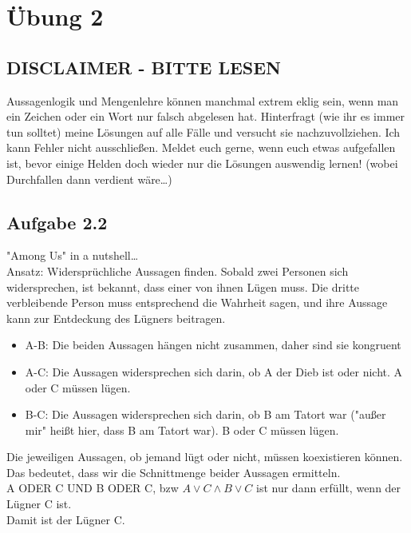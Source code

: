 \documentclass{standalone}
\begin{document}
\section{Übung 2}

\subsection{DISCLAIMER - BITTE LESEN}
Aussagenlogik und Mengenlehre können manchmal extrem eklig sein, wenn man ein Zeichen oder ein Wort nur falsch abgelesen hat.
Hinterfragt (wie ihr es immer tun solltet) meine Lösungen auf alle Fälle und versucht sie nachzuvollziehen. 
Ich kann Fehler nicht ausschließen. Meldet euch gerne, wenn euch etwas aufgefallen ist, bevor einige Helden doch wieder nur die Lösungen auswendig lernen! (wobei Durchfallen dann verdient wäre\dots)

\subsection{Aufgabe 2.2}
"Among Us" in a nutshell\dots\\

Ansatz: Widersprüchliche Aussagen finden. Sobald zwei Personen sich widersprechen, ist bekannt, dass einer von ihnen Lügen muss. Die dritte verbleibende Person muss entsprechend die Wahrheit sagen, und ihre Aussage kann zur Entdeckung des Lügners beitragen.
\begin{itemize}
    \item A-B: Die beiden Aussagen hängen nicht zusammen, daher sind sie kongruent
    \item A-C: Die Aussagen widersprechen sich darin, ob A der Dieb ist oder nicht. A oder C müssen lügen.
    \item B-C: Die Aussagen widersprechen sich darin, ob B am Tatort war ("außer mir" heißt hier, dass B am Tatort war). B oder C müssen lügen.
\end{itemize}
Die jeweiligen Aussagen, ob jemand lügt oder nicht, müssen koexistieren können. Das bedeutet, dass wir die Schnittmenge beider Aussagen ermitteln. \\
A ODER C UND B ODER C, bzw $A \vee C \wedge B \vee C$ ist nur dann erfüllt, wenn der Lügner C ist. \\
Damit ist der Lügner C.
\end{document}
